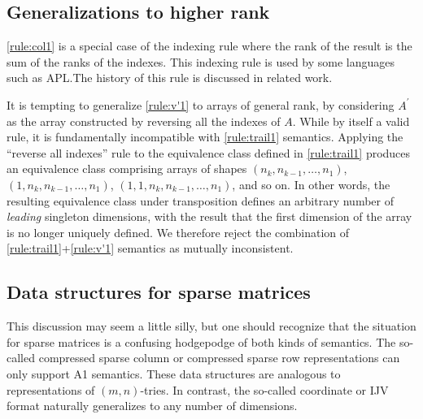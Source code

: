 
\subsection{Generalizations to higher rank}

\ref{rule:col1} is a special case of the indexing rule where the rank of the
result is the sum of the ranks of the indexes. This indexing rule is used by
some languages such as APL.\@ The history of this rule is discussed in
related work.

It is tempting to generalize \ref{rule:v'1} to arrays of general rank, by
considering $A^\prime$ as the array constructed by reversing all the indexes of
$A$. While by itself a valid rule, it is fundamentally incompatible with
\ref{rule:trail1} semantics. Applying the ``reverse all indexes'' rule to the
equivalence class defined in \ref{rule:trail1} produces an equivalence class
comprising arrays of shapes $(n_k, n_{k-1}, \dots, n_1)$, $(1, n_k, n_{k-1},
\dots, n_1)$, $(1, 1, n_k, n_{k-1}, \dots, n_1)$, and so on. In other words,
the resulting equivalence class under transposition defines an arbitrary number
of \textit{leading} singleton dimensions, with the result that the first
dimension of the array is no longer uniquely defined. We therefore reject the
combination of \ref{rule:trail1}+\ref{rule:v'1} semantics as mutually
inconsistent.



\subsection{Data structures for sparse matrices}

This discussion may seem a little silly, but one should recognize
that the situation for sparse matrices is a confusing hodgepodge of
both kinds of semantics. The so-called compressed sparse column or
compressed sparse row representations can only support A1 semantics.
These data structures are analogous to representations of $\left(m,n\right)$-tries.
In contrast, the so-called coordinate or IJV format naturally generalizes
to any number of dimensions.

